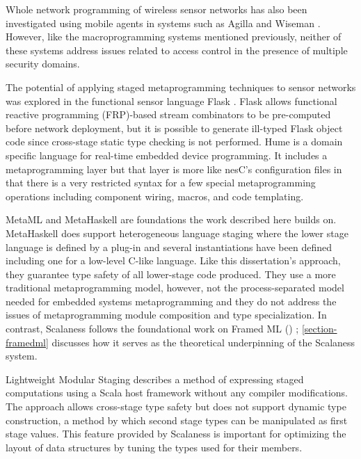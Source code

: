 Whole network programming of wireless sensor networks has also been investigated using mobile
agents in systems such as Agilla \cite{Fok:2009:AMA:1552297.1552299} and Wiseman
\cite{Gonzalez-Valenzuela:2010:PMW:1891545.1891566}. However, like the macro\-programming
systems mentioned previously, neither of these systems address issues related to access control
in the presence of multiple security domains.


The potential of applying staged metaprogramming techniques to sensor networks was explored in
the functional sensor language Flask \cite{Mainland-Flask-2008}. Flask allows functional
reactive programming (FRP)-based stream combinators to be pre-computed before network
deployment, but it is possible to generate ill-typed Flask object code since cross-stage static
type checking is not performed. Hume \cite{Hume} is a domain specific language for real-time
embedded device programming. It includes a metaprogramming layer but that layer is more like
nesC's configuration files in that there is a very restricted syntax for a few special
metaprogramming operations including component wiring, macros, and code templating.

MetaML \cite{Taha-MetaML,DBLP:conf/icess/Taha04} and MetaHaskell \cite{mainland12} are
foundations the work described here builds on. MetaHaskell does support heterogeneous language
staging where the lower stage language is defined by a plug-in and several instantiations have
been defined including one for a low-level C-like language. Like this dissertation's approach,
they guarantee type safety of all lower-stage code produced. They use a more traditional
metaprogramming model, however, not the process-separated model needed for embedded systems
metaprogramming and they do not address the issues of metaprogramming module composition and
type specialization. In contrast, Scalaness follows the foundational work on Framed ML (\fml)
\cite{FramedML}; \autoref{section-framedml} discusses how it serves as the theoretical
underpinning of the Scalaness system.

Lightweight Modular Staging \cite{Rompf-LMS} describes a method of expressing staged
computations using a Scala host framework without any compiler modifications. The approach
allows cross-stage type safety but does not support dynamic type construction, a method by which
second stage types can be manipulated as first stage values. This feature provided by Scalaness
is important for optimizing the layout of data structures by tuning the types used for their
members.

